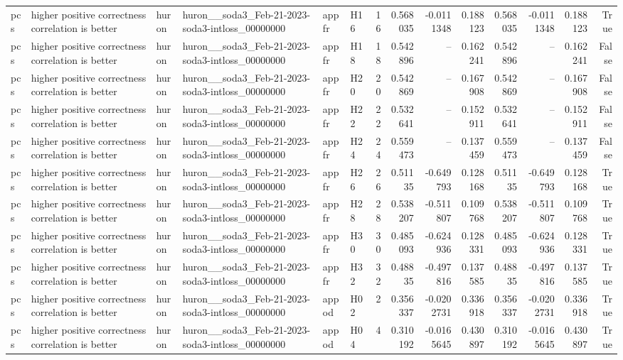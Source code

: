 \begin{longtable}{llllllrrrrrrrr}
pcs & higher positive correctness correlation is better & huron & huron\_\_soda3\_Feb-21-2023-soda3-intloss\_00000000 & appfr & H16 & 16 & 0.568035 & -0.0111348 & 0.188123 & 0.568035 & -0.0111348 & 0.188123 & True \\
pcs & higher positive correctness correlation is better & huron & huron\_\_soda3\_Feb-21-2023-soda3-intloss\_00000000 & appfr & H18 & 18 & 0.542896 & -- & 0.162241 & 0.542896 & -- & 0.162241 & False \\
pcs & higher positive correctness correlation is better & huron & huron\_\_soda3\_Feb-21-2023-soda3-intloss\_00000000 & appfr & H20 & 20 & 0.542869 & -- & 0.167908 & 0.542869 & -- & 0.167908 & False \\
pcs & higher positive correctness correlation is better & huron & huron\_\_soda3\_Feb-21-2023-soda3-intloss\_00000000 & appfr & H22 & 22 & 0.532641 & -- & 0.152911 & 0.532641 & -- & 0.152911 & False \\
pcs & higher positive correctness correlation is better & huron & huron\_\_soda3\_Feb-21-2023-soda3-intloss\_00000000 & appfr & H24 & 24 & 0.559473 & -- & 0.137459 & 0.559473 & -- & 0.137459 & False \\
pcs & higher positive correctness correlation is better & huron & huron\_\_soda3\_Feb-21-2023-soda3-intloss\_00000000 & appfr & H26 & 26 & 0.51135 & -0.649793 & 0.128168 & 0.51135 & -0.649793 & 0.128168 & True \\
pcs & higher positive correctness correlation is better & huron & huron\_\_soda3\_Feb-21-2023-soda3-intloss\_00000000 & appfr & H28 & 28 & 0.538207 & -0.511807 & 0.109768 & 0.538207 & -0.511807 & 0.109768 & True \\
pcs & higher positive correctness correlation is better & huron & huron\_\_soda3\_Feb-21-2023-soda3-intloss\_00000000 & appfr & H30 & 30 & 0.485093 & -0.624936 & 0.128331 & 0.485093 & -0.624936 & 0.128331 & True \\
pcs & higher positive correctness correlation is better & huron & huron\_\_soda3\_Feb-21-2023-soda3-intloss\_00000000 & appfr & H32 & 32 & 0.48835 & -0.497816 & 0.137585 & 0.48835 & -0.497816 & 0.137585 & True \\
pcs & higher positive correctness correlation is better & huron & huron\_\_soda3\_Feb-21-2023-soda3-intloss\_00000000 & appod & H02 & 2 & 0.356337 & -0.0202731 & 0.336918 & 0.356337 & -0.0202731 & 0.336918 & True \\
pcs & higher positive correctness correlation is better & huron & huron\_\_soda3\_Feb-21-2023-soda3-intloss\_00000000 & appod & H04 & 4 & 0.310192 & -0.0165645 & 0.430897 & 0.310192 & -0.0165645 & 0.430897 & True \\

\end{longtable}
